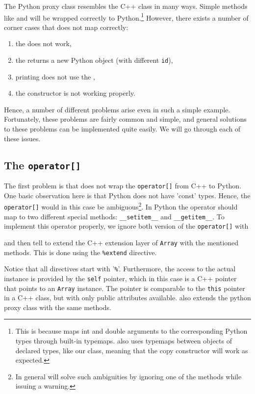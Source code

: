 The Python proxy class resembles the C++ class in many ways. Simple methods like  and  will be wrapped correctly to Python.\footnote{This is because \swig maps int and double arguments to the corresponding Python types through built-in typemaps. \swig also uses typemaps between objects of declared types, like our  class, meaning that the copy constructor will work as expected.} However, there exists a number of corner cases that \swig does not map correctly:
\begin{enumerate}
\item the  does not work,
\item the  returns a new Python object (with different \texttt{id}),
\item printing does not use the ,%
\item the  constructor is not working properly.%
\end{enumerate}
Hence, a number of different problems arise even in such a simple example. Fortunately, these problems are fairly common and simple, and general solutions to these problems can be implemented quite easily. We will go through each of these issues.\par

\subsection{The \texttt{operator[]}}
The first problem is that \swig does not wrap the \texttt{operator[]} from C++ to Python.
One basic observation here is that Python does not have 'const' types. Hence,
the \texttt{operator[]} would in this case be ambiguous\footnote{In general will \swig solve such ambiguities by ignoring one of the methods while issuing a warning.}.
In Python the operator should map to two different special methods: \texttt{\_\_setitem\_\_} and \texttt{\_\_getitem\_\_}. To implement this operator properly, we ignore both version of the \texttt{operator[]} with
\begin{code}
\end{code}
and then tell \swig to extend the C++ extension layer of \texttt{Array} with the mentioned methods. This is done using the \texttt{\%extend} directive.
Notice that all \swig directives start with '\texttt{\%}'.
Furthermore, the access to the actual instance is provided by the \texttt{self} pointer, which in this case is a C++ pointer that points to an \texttt{Array} instance. The pointer is comparable to the \texttt{this} pointer in a C++ class, but with only public attributes available. \swig also extends the python proxy class with the same methods.\par

